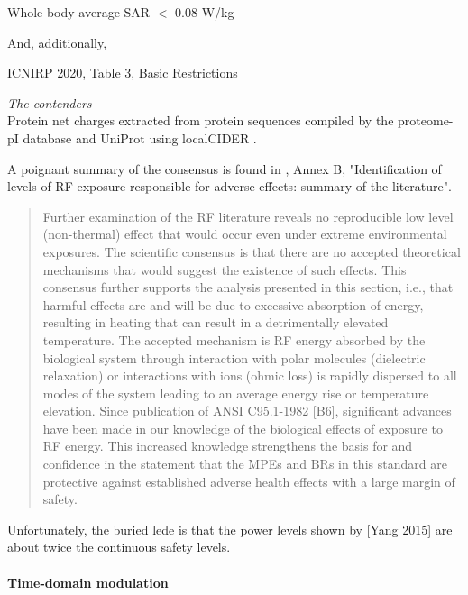 \documentclass[fleqn,10pt]{article}
\begin{document}
Whole-body average SAR $<$ 0.08 W/kg

And, additionally, 

ICNIRP 2020, Table 3, Basic Restrictions


\clearpage
{\Large \it The contenders}\\



Protein net charges extracted from protein sequences compiled by the proteome-pI database \cite{ProteomepI2017} and UniProt using localCIDER \cite{CIDER2017} . 


\clearpage

A poignant summary of the consensus is found in \cite{IEEE2006}, Annex B, "Identification of levels of RF exposure responsible for adverse effects: summary of the literature".

\begin{quote}
Further examination of the RF literature reveals no reproducible low level (non-thermal) effect that would
occur even under extreme environmental exposures. The scientific consensus is that there are no accepted
theoretical mechanisms that would suggest the existence of such effects. This consensus further supports the
analysis presented in this section, i.e., that harmful effects are and will be due to excessive absorption of
energy, resulting in heating that can result in a detrimentally elevated temperature. The accepted mechanism
is RF energy absorbed by the biological system through interaction with polar molecules (dielectric relaxation) or interactions with ions (ohmic loss) is rapidly dispersed to all modes of the system leading to an
average energy rise or temperature elevation. Since publication of ANSI C95.1-1982 [B6], significant
advances have been made in our knowledge of the biological effects of exposure to RF energy. This
increased knowledge strengthens the basis for and confidence in the statement that the MPEs and BRs in this
standard are protective against established adverse health effects with a large margin of safety.

\end{quote}

Unfortunately, the buried lede is that the power levels shown by [Yang 2015] are about twice the continuous safety levels. 

\paragraph{Time-domain modulation}
\end{document}
